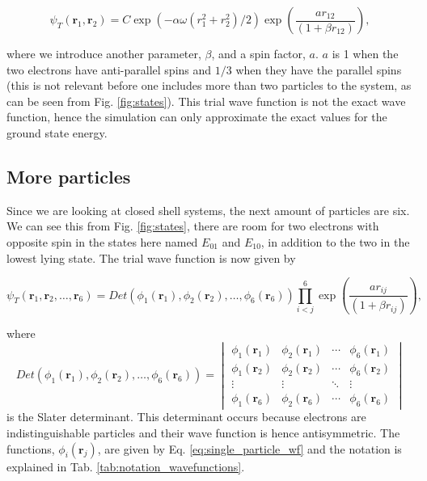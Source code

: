 \begin{equation}
   \psi_{T}(\bm{r}_1,\bm{r}_2) = 
   C\exp{\left(-\alpha\omega(r_1^2+r_2^2)/2\right)}
   \exp{\left(\frac{ar_{12}}{(1+\beta r_{12})}\right)}, 
\label{eq:trial_interacting}
\end{equation}

where we introduce another parameter, $\beta$, and a spin factor, $a$. $a$ is 1 when the two electrons have anti-parallel spins and $1/3$ when they have the parallel spins (this is not relevant before one includes more than two particles to the system, as can be seen from Fig. \ref{fig:states}). This trial wave function is not the exact wave function, hence the simulation can only approximate the exact values for the ground state energy.

\subsection{More particles}

Since we are looking at closed shell systems, the next amount of particles are six. We can see this from Fig. \ref{fig:states}, there are room for two electrons with opposite spin in the states here named $E_{01}$ and $E_{10}$, in addition to the two in the lowest lying state. The trial wave function is now given by

\begin{equation}
   \psi_{T}(\bm{r}_1,\bm{r}_2,\dots, \bm{r}_6) = 
   Det\left(\phi_{1}(\bm{r}_1),\phi_{2}(\bm{r}_2),
   \dots,\phi_{6}(\bm{r}_6)\right)
   \prod_{i<j}^{6}\exp{\left(\frac{a r_{ij}}{(1+\beta r_{ij})}\right)},
\end{equation}

where 
$$ Det\left(\phi_{1}(\bm{r}_1),\phi_{2}(\bm{r}_2),
   \dots,\phi_{6}(\bm{r}_6)\right) =  \begin{vmatrix}
  \phi_{1}(\bm{r}_1) & \phi_{2}(\bm{r}_1) & \cdots & \phi_{6}(\bm{r}_1) \\
  \phi_{1}(\bm{r}_2) & \phi_{2}(\bm{r}_2) & \cdots & \phi_{6}(\bm{r}_2) \\
  \vdots  & \vdots  & \ddots & \vdots  \\
  \phi_{1}(\bm{r}_6) & \phi_{2}(\bm{r}_6) & \cdots & \phi_{6}(\bm{r}_6) 
\end{vmatrix}$$
is the Slater determinant. This determinant occurs because electrons are indistinguishable particles and their wave function is hence antisymmetric. The functions, $\phi_{i}(\bm{r}_j)$,  are given by Eq. \ref{eq:single_particle_wf} and the notation is explained in Tab. \ref{tab:notation_wavefunctions}. 

